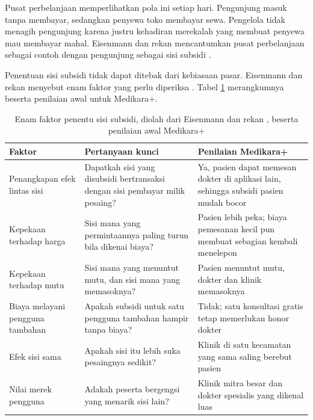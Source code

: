 Pusat perbelanjaan memperlihatkan pola ini setiap hari. Pengunjung masuk tanpa
membayar, sedangkan penyewa toko membayar sewa. Pengelola tidak menagih
pengunjung karena justru kehadiran merekalah yang membuat penyewa mau membayar
mahal. Eisenmann dan rekan mencantumkan pusat perbelanjaan sebagai contoh
dengan pengunjung sebagai sisi subsidi \cite{eisenmann2006strategies}.

Penentuan sisi subsidi tidak dapat ditebak dari kebiasaan pasar. Eisenmann dan
rekan menyebut enam faktor yang perlu diperiksa
\cite{eisenmann2006strategies}. Tabel \ref{tab:ch02-faktor-subsidi}
merangkumnya beserta penilaian awal untuk Medikara+.

\begin{table}[!htb]
  \centering
  \caption{Enam faktor penentu sisi subsidi, diolah dari Eisenmann dan rekan
           \cite{eisenmann2006strategies}, beserta penilaian awal Medikara+}
  \label{tab:ch02-faktor-subsidi}
  \small
  \begin{tabularx}{\textwidth}{lXX}
    \hline
    \textbf{Faktor} & \textbf{Pertanyaan kunci} & \textbf{Penilaian Medikara+} \\
    \hline
    Penangkapan efek lintas sisi & Dapatkah sisi yang disubsidi bertransaksi dengan sisi pembayar milik pesaing? & Ya, pasien dapat memesan dokter di aplikasi lain, sehingga subsidi pasien mudah bocor \\
    \hline
    Kepekaan terhadap harga & Sisi mana yang permintaannya paling turun bila dikenai biaya? & Pasien lebih peka; biaya pemesanan kecil pun membuat sebagian kembali menelepon \\
    \hline
    Kepekaan terhadap mutu & Sisi mana yang menuntut mutu, dan sisi mana yang memasoknya? & Pasien menuntut mutu, dokter dan klinik memasoknya \\
    \hline
    Biaya melayani pengguna tambahan & Apakah subsidi untuk satu pengguna tambahan hampir tanpa biaya? & Tidak; satu konsultasi gratis tetap memerlukan honor dokter \\
    \hline
    Efek sisi sama & Apakah sisi itu lebih suka pesaingnya sedikit? & Klinik di satu kecamatan yang sama saling berebut pasien \\
    \hline
    Nilai merek pengguna & Adakah peserta bergengsi yang menarik sisi lain? & Klinik mitra besar dan dokter spesialis yang dikenal luas \\
    \hline
  \end{tabularx}
\end{table}


